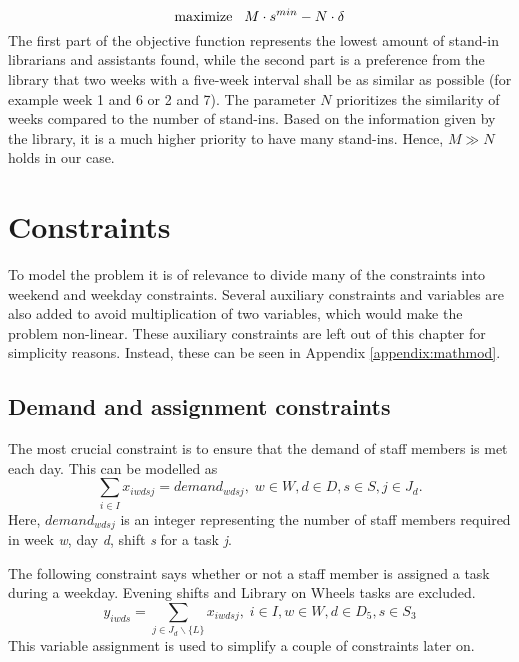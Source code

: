 \begin{equation} \label{objfcn}
\text{maximize} \hspace{0.3cm} M\cdot s^{min} - N \cdot \delta
\end{equation}
The first part of the objective function represents the lowest amount of stand-in librarians and assistants found, while the second part is a preference from the library that two weeks with a five-week interval shall be as similar as possible (for example week 1 and 6 or 2 and 7). The parameter $N$ prioritizes the similarity of weeks compared to the number of stand-ins. Based on the information given by the library, it is a much higher priority to have many stand-ins. Hence, $M \gg N$ holds in our case.




\section{Constraints} \label{constraints}
To model the problem it is of relevance to divide many of the constraints into weekend and weekday constraints. Several auxiliary constraints and variables are also added to avoid multiplication of two variables, which would make the problem non-linear. These auxiliary constraints are left out of this chapter for simplicity reasons. Instead, these can be seen in Appendix \ref{appendix:mathmod}.

\subsection{Demand and assignment constraints} \label{section:demand_ass_constraints}
The most crucial constraint is to ensure that the demand of staff members is met each day. This can be modelled as
\begin{equation} \label{eq:demand}
\sum_{i \in I} x_{iwdsj} = demand_{wdsj}, \;   w\in W,d\in D,s\in S,j\in J_d.
\end{equation}
Here, $demand_{wdsj}$ is an integer representing the number of staff members required in week \textit{w}, day \textit{d}, shift \textit{s} for a task \textit{j}.

The following constraint says whether or not a staff member is assigned a task during a weekday. Evening shifts and Library on Wheels tasks are excluded.
\begin{equation} \label{constr:y_assign}
y_{iwds} = \sum_{j \in J_d\backslash \{L\}} x_{iwdsj}, \;   i \in I, w \in W, d \in D_5, s \in S_3
\end{equation}
This variable assignment is used to simplify a couple of constraints later on.

